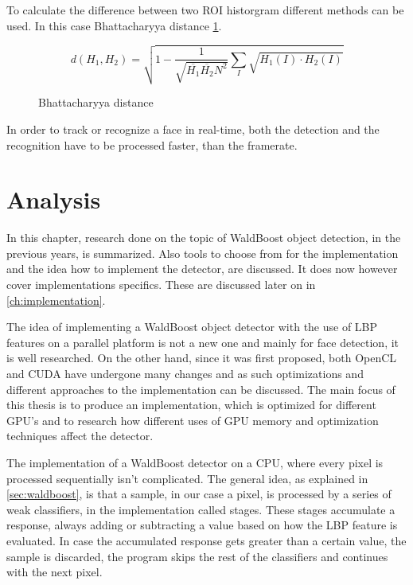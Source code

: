 To calculate the difference between two ROI historgram different methods can be used. In this case Bhattacharyya distance \ref{eq:bhatta}.

\begin{figure}
\begin{equation}
d(H_{1},H_{2})=\sqrt{1-\frac{1}{\sqrt{\overline{H_{1}}\overline{H_{2}}N^2}}\sum\limits_{I}\sqrt{H_{1}(I) \cdot H_{2}(I)}}
\end{equation}
\caption{Bhattacharyya distance}
\label{eq:bhatta}
\end{figure}

In order to track or recognize a face in real-time, both the detection and the recognition have to be processed faster, than the framerate.

\chapter{Analysis}

In this chapter, research done on the topic of WaldBoost object detection, in the previous years, is summarized. Also tools to choose from for the implementation and the idea how to implement the detector, are discussed. It does now however cover implementations specifics. These are discussed later on in \ref{ch:implementation}.

The idea of implementing a WaldBoost object detector with the use of LBP features on a parallel platform is not a new one and mainly for face detection, it is well researched. On the other hand, since it was first proposed, both OpenCL and CUDA have undergone many changes and as such optimizations and different approaches to the implementation can be discussed. The main focus of this thesis is to produce an implementation, which is optimized for different GPU's and to research how different uses of GPU memory and optimization techniques affect the detector.

The implementation of a WaldBoost detector on a CPU, where every pixel is processed sequentially isn't complicated. The general idea, as explained in \ref{sec:waldboost}, is that a sample, in our case a pixel, is processed by a series of weak classifiers, in the implementation called stages. These stages accumulate a response, always adding or subtracting a value based on how the LBP feature is evaluated. In case the accumulated response gets greater than a certain value, the sample is discarded, the program skips the rest of the classifiers and continues with the next pixel.

